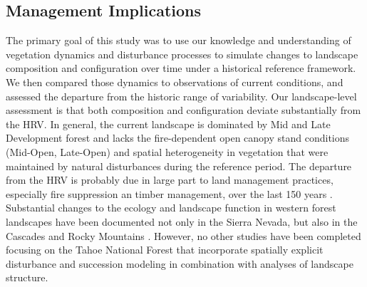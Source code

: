 \clearpage
\subsection{Management Implications}

The primary goal of this study was to use our knowledge and understanding of vegetation dynamics and disturbance processes to simulate changes to landscape composition and configuration over time under a historical reference framework. We then compared those dynamics to observations of current conditions, and assessed the departure from the historic range of variability. Our landscape-level assessment is that both composition and configuration deviate substantially from the HRV. In general, the current landscape is dominated by Mid and Late Development forest and lacks the fire-dependent open canopy stand conditions (Mid-Open, Late-Open) and spatial heterogeneity in vegetation that were maintained by natural disturbances during the reference period. The departure from the HRV is probably due in large part to land management practices, especially fire suppression an timber management, over the last 150 years \citep{Safford2014,Stephens2007}. Substantial changes to the ecology and landscape function in western forest landscapes have been documented not only in the Sierra Nevada, but also in the Cascades and Rocky Mountains \citep{Hessburg2005,Baker2012,Baker2014,Mallek2013,Agee1993} . However, no other studies have been completed focusing on the Tahoe National Forest that incorporate spatially explicit disturbance and succession modeling in combination with analyses of landscape structure.

